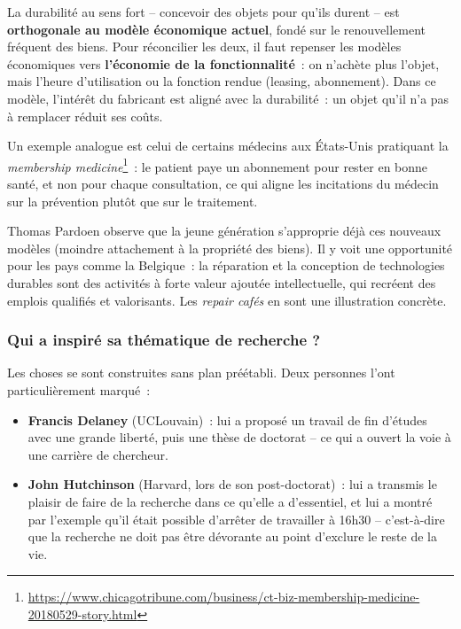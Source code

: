 La durabilité au sens fort -- concevoir des objets pour qu'ils durent -- est \textbf{orthogonale au modèle économique actuel}, fondé sur le renouvellement fréquent des biens. Pour réconcilier les deux, il faut repenser les modèles économiques vers \textbf{l'économie de la fonctionnalité}~: on n'achète plus l'objet, mais l'heure d'utilisation ou la fonction rendue (leasing, abonnement). Dans ce modèle, l'intérêt du fabricant est aligné avec la durabilité~: un objet qu'il n'a pas à remplacer réduit ses coûts.

Un exemple analogue est celui de certains médecins aux États-Unis pratiquant la \emph{membership medicine}\footnote{\url{https://www.chicagotribune.com/business/ct-biz-membership-medicine-20180529-story.html}}~: le patient paye un abonnement pour rester en bonne santé, et non pour chaque consultation, ce qui aligne les incitations du médecin sur la prévention plutôt que sur le traitement.

Thomas Pardoen observe que la jeune génération s'approprie déjà ces nouveaux modèles (moindre attachement à la propriété des biens). Il y voit une opportunité pour les pays comme la Belgique~: la réparation et la conception de technologies durables sont des activités à forte valeur ajoutée intellectuelle, qui recréent des emplois qualifiés et valorisants. Les \emph{repair cafés} en sont une illustration concrète.

\subsubsection{Qui a inspiré sa thématique de recherche ?}

Les choses se sont construites sans plan préétabli. Deux personnes l'ont particulièrement marqué~:

\begin{itemize}
    \item \textbf{Francis Delaney} (UCLouvain)~: lui a proposé un travail de fin d'études avec une grande liberté, puis une thèse de doctorat -- ce qui a ouvert la voie à une carrière de chercheur.
    \item \textbf{John Hutchinson} (Harvard, lors de son post-doctorat)~: lui a transmis le plaisir de faire de la recherche dans ce qu'elle a d'essentiel, et lui a montré par l'exemple qu'il était possible d'arrêter de travailler à 16h30 -- c'est-à-dire que la recherche ne doit pas être dévorante au point d'exclure le reste de la vie.
\end{itemize}

